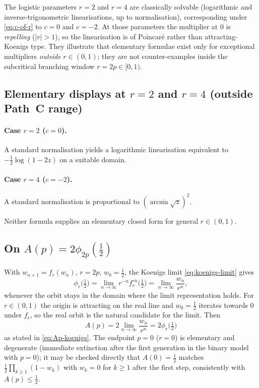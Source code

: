 \begin{remark}
\label{rem:r2r4}
The logistic parameters $r=2$ and $r=4$ are classically solvable (logarithmic and inverse-trigonometric linearisations, up to normalisation), corresponding under \eqref{eq:c-of-r} to $c=0$ and $c=-2$. At those parameters the multiplier at $0$ is \emph{repelling} ($|r|>1$), so the linearisation is of Poincar\'e rather than attracting-Koenigs type. They illustrate that elementary formulae exist only for exceptional multipliers \emph{outside} $r\in(0,1)$; they are not counter-examples inside the subcritical branching window $r=2p\in[0,1)$.
\end{remark}

\subsection{Elementary displays at $r=2$ and $r=4$ (outside Path~C range)}

\paragraph{Case $r=2$ ($c=0$).}
A standard normalisation yields a logarithmic linearisation equivalent to $-\tfrac12\log(1-2z)$ on a suitable domain.

\paragraph{Case $r=4$ ($c=-2$).}
A standard normalisation is proportional to $(\arcsin\sqrt{z})^2$.

Neither formula supplies an elementary closed form for general $r\in(0,1)$.

\subsection{On $A(p)=2\phi_{2p}(\tfrac12)$}

With $w_{n+1}=f_r(w_n)$, $r=2p$, $w_0=\tfrac12$, the Koenigs limit \eqref{eq:koenigs-limit} gives
\[
\phi_r\bigl(\tfrac12\bigr)
=
\lim_{n\to\infty}
r^{-n} f_r^{\circ n}\bigl(\tfrac12\bigr)
=
\lim_{n\to\infty}
\frac{w_n}{r^n},
\]
whenever the orbit stays in the domain where the limit representation holds. For $r\in(0,1)$ the origin is attracting on the real line and $w_0=\tfrac12$ iterates towards $0$ under $f_r$, so the real orbit is the natural candidate for the limit. Then
\[
A(p)
=
2\lim_{n\to\infty}\frac{w_n}{r^n}
=
2\phi_r\bigl(\tfrac12\bigr)
\]
as stated in \eqref{eq:Ap-koenigs}. The endpoint $p=0$ ($r=0$) is elementary and degenerate (immediate extinction after the first generation in the binary model with $p=0$); it may be checked directly that $A(0)=\tfrac12$ matches $\tfrac12\prod_{k\geq 1}(1-w_k)$ with $w_k=0$ for $k\geq 1$ after the first step, consistently with $A(p)\leq\tfrac12$.

